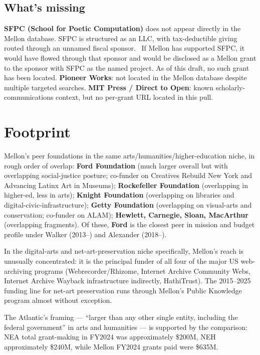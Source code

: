 \documentclass[10pt,letterpaper,twocolumn]{article}
\begin{document}
\subsection{What's missing}

\textbf{SFPC (School for Poetic Computation)} does not appear directly in the Mellon database. SFPC is structured as an LLC, with tax-deductible giving routed through an unnamed fiscal sponsor.~\citep{sfpcdossier} If Mellon has supported SFPC, it would have flowed through that sponsor and would be disclosed as a Mellon grant to the sponsor with SFPC as the named project. As of this draft, no such grant has been located. \textbf{Pioneer Works}: not located in the Mellon database despite multiple targeted searches. \textbf{MIT Press / Direct to Open}: known scholarly-communications context, but no per-grant URL located in this pull.

\section{Footprint}

Mellon's peer foundations in the same arts/humanities/higher-education niche, in rough order of overlap: \textbf{Ford Foundation} (much larger overall but with overlapping social-justice posture; co-funder on Creatives Rebuild New York and Advancing Latinx Art in Museums); \textbf{Rockefeller Foundation} (overlapping in higher-ed, less in arts); \textbf{Knight Foundation} (overlapping on libraries and digital-civic-infrastructure); \textbf{Getty Foundation} (overlapping on visual-arts and conservation; co-funder on ALAM); \textbf{Hewlett, Carnegie, Sloan, MacArthur} (overlapping fragments). Of these, \textbf{Ford} is the closest peer in mission and budget profile under Walker (2013--) and Alexander (2018--).

In the digital-arts and net-art-preservation niche specifically, Mellon's reach is unusually concentrated: it is the principal funder of all four of the major US web-archiving programs (Webrecorder/Rhizome, Internet Archive Community Webs, Internet Archive Wayback infrastructure indirectly, HathiTrust). The 2015--2025 funding line for net-art preservation runs through Mellon's Public Knowledge program almost without exception.

The Atlantic's framing --- ``larger than any other single entity, including the federal government'' in arts and humanities --- is supported by the comparison: NEA total grant-making in FY2024 was approximately \$200M, NEH approximately \$240M, while Mellon FY2024 grants paid were \$635M.~\citep{atlantic2023mellon,propublicamellon}
\end{document}

